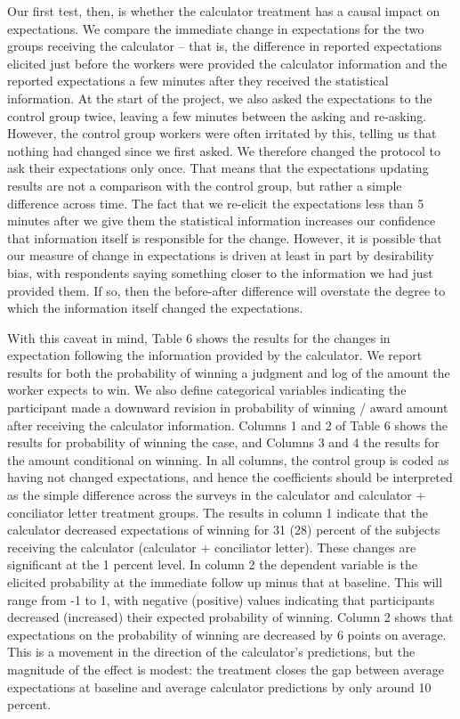 \documentclass[12 pt]{article}
\begin{document}
Our first test, then, is whether the calculator treatment has a causal impact on expectations. We compare the immediate change in expectations for the two groups receiving the calculator – that is, the difference in reported expectations elicited just before the workers were provided the calculator information and the reported expectations a few minutes after they received the statistical information. At the start of the project, we also asked the expectations to the control group twice, leaving a few minutes between the asking and re-asking. However, the control group workers were often irritated by this, telling us that nothing had changed since we first asked. We therefore changed the protocol to ask their expectations only once. That means that the expectations updating results are not a comparison with the control group, but rather a simple difference across time. The fact that we re-elicit the expectations less than 5 minutes after we give them the statistical information increases our confidence that information itself is responsible for the change. However, it is possible that our measure of change in expectations is driven at least in part by desirability bias, with respondents saying something closer to the information we had just provided them. If so, then the before-after difference will overstate the degree to which the information itself changed the expectations. 

With this caveat in mind, Table 6 shows the results for the changes in expectation following the information provided by the calculator. We report results for both the probability of winning a judgment and log of the amount the worker expects to win. We also define categorical variables indicating the participant made a downward revision in probability of winning / award amount after receiving the calculator information. Columns 1 and 2 of Table 6 shows the results for probability of winning the case, and Columns 3 and 4 the results for the amount conditional on winning. In all columns, the control group is coded as having not changed expectations, and hence the coefficients should be interpreted as the simple difference across the surveys in the calculator and calculator + conciliator letter treatment groups. The results in column 1 indicate that the calculator decreased expectations of winning for 31 (28) percent of the subjects receiving the calculator (calculator + conciliator letter). These changes are significant at the 1 percent level. In column 2 the dependent variable is the elicited probability at the immediate follow up minus that at baseline. This will range from -1 to 1, with negative (positive) values indicating that participants decreased (increased) their expected probability of winning. Column 2 shows that expectations on the probability of winning are decreased by 6 points on average. This is a movement in the direction of the calculator’s predictions, but the magnitude of the effect is modest: the treatment closes the gap between average expectations at baseline and average calculator predictions by only around 10 percent. 
\end{document}
